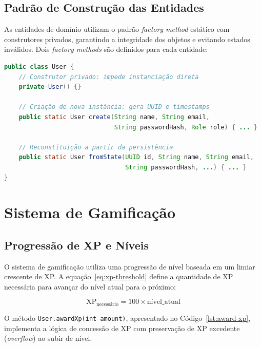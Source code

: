 \subsection{Padrão de Construção das Entidades}
\label{subsec:padrao-construcao}

As entidades de domínio utilizam o padrão \textit{factory method} estático com
construtores privados, garantindo a integridade dos objetos e evitando estados
inválidos. Dois \textit{factory methods} são definidos para cada entidade:

\begin{lstlisting}[language=Java, caption={Factory methods da entidade User},label={lst:factory-methods}]
public class User {
    // Construtor privado: impede instanciação direta
    private User() {}

    // Criação de nova instância: gera UUID e timestamps
    public static User create(String name, String email,
                              String passwordHash, Role role) { ... }

    // Reconstituição a partir da persistência
    public static User fromState(UUID id, String name, String email,
                                 String passwordHash, ...) { ... }
}
\end{lstlisting}

\section{Sistema de Gamificação}
\label{sec:gamificacao-impl}

\subsection{Progressão de XP e Níveis}
\label{subsec:progressao-xp}

O sistema de gamificação utiliza uma progressão de nível baseada em um limiar
crescente de XP. A equação~\ref{eq:xp-threshold} define a quantidade de XP
necessária para avançar do nível atual para o próximo:

\begin{equation}
  \label{eq:xp-threshold}
  \text{XP}_{\text{necessário}} = 100 \times \text{nível\_atual}
\end{equation}

O método \texttt{User.awardXp(int amount)}, apresentado no
Código~\ref{lst:award-xp}, implementa a lógica de concessão de XP com preservação
de XP excedente (\textit{overflow}) ao subir de nível:

